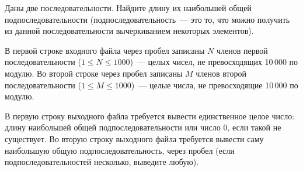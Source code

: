 

Даны две последовательности. Найдите длину их наибольшей общей подпоследовательности (подпоследовательность~--- это то, что можно получить из данной последовательности вычеркиванием некоторых элементов).

\InputFile
В первой строке входного файла через пробел записаны $N$ членов первой последовательности ($1 \leqslant N \leqslant 1000$)~---
 целых чисел, не превосходящих 10\,000 по модулю.
Во второй строке через пробел записаны $M$ членов второй последовательности ($1 \leqslant M \leqslant 1000$)~--- 
целые числа, не превосходящие 10\,000 по модулю.

\OutputFile
В первую строку выходного файла требуется вывести единственное целое число: длину наибольшей общей подпоследовательности или число 0, если такой не существует.
Во вторую строку выходного файла требуется вывести саму наибольшую общую подпоследовательность, 
через пробел (если подпоследовательностей несколько, выведите любую).

